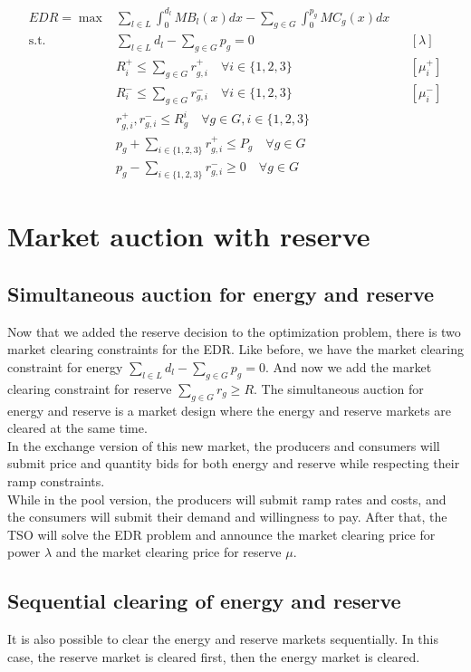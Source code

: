 \documentclass[12pt, openany]{report}
\theoremstyle{definition}
\begin{document}
\begin{equation}
    \begin{aligned}
        EDR = \max & \sum_{l \in L}  \int_{0}^{d_l} MB_l(x)dx - \sum_{g \in G} \int_{0        }^{p_g} MC_g(x)dx &&\\
        \text{s.t.} \quad & \sum_{l \in L} d_l - \sum_{g \in G} p_g = 0 && [\lambda] \\
        & R_i^+ \leq \sum_{g \in G} r_{g,i}^+ \quad \forall i \in \{1,2,3\} && [\mu_i^+] \\
        & R_i^- \leq \sum_{g \in G} r_{g,i}^- \quad \forall i \in \{1,2,3\} && [\mu_i^-] \\
        & r_{g,i}^+, r_{g,i}^- \leq R_g^i \quad \forall g \in G, i \in \{1,2,3\} \\
        & p_g + \sum_{i \in \{1,2,3\}} r_{g,i}^+ \leq P_g \quad \forall g \in G \\
        & p_g - \sum_{i \in \{1,2,3\}} r_{g,i}^- \geq 0 \quad \forall g \in G 
    \end{aligned}
\end{equation}
\section{Market auction with reserve}
\subsection{Simultaneous auction for energy and reserve}
Now that we added the reserve decision to the optimization problem, there is two market clearing constraints for the EDR. Like before, we have the market clearing constraint for energy $\sum_{l \in L} d_l - \sum_{g \in G} p_g = 0$. And now we add the market clearing constraint for reserve $\sum_{g \in G} r_g \geq R$. The simultaneous auction for energy and reserve is a market design where the energy and reserve markets are cleared at the same time.\\
In the exchange version of this new market, the producers and consumers will submit price and quantity bids for both energy and reserve while respecting their ramp constraints.\\
While in the pool version, the producers will submit ramp rates and costs, and the consumers will submit their demand and willingness to pay. After that, the TSO will solve the EDR problem and announce the market clearing price for power $\lambda$ and the market clearing price for reserve $\mu$. 
\subsection{Sequential clearing of energy and reserve}
It is also possible to clear the energy and reserve markets sequentially. In this case, the reserve market is cleared first, then the energy market is cleared. 
\end{document}
